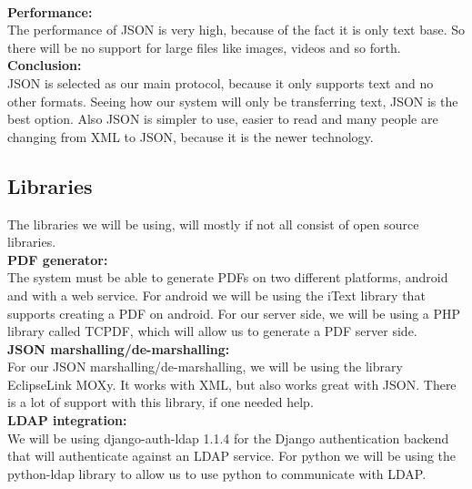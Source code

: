 \documentclass[12pt]{article}
\begin{document}
		\\\linebreak
		\textbf{Performance:}
		\\\linebreak
		The performance of JSON is very high, because of the fact it is only text base. So there will be no 		support for large files like images, videos and so forth.
		\\\linebreak\linebreak
		\textbf{Conclusion:}
		\\\linebreak
		JSON is selected as our main protocol, because it only supports text and no other formats. Seeing how 		our system will only be transferring text, JSON is the best option. Also JSON is simpler to use, 			easier to read and many people are changing from XML to JSON, because it is the newer technology.
				
		\vspace{0.5cm}
				
		\subsection{Libraries}
		\vspace{0.5cm}
		
		The libraries we will be using, will mostly if not all consist of open source libraries.
		\\\linebreak
		\textbf{PDF generator:}
		\\\linebreak
		The system must be able to generate PDFs on two different platforms, android and with a web service. 		For android we will be using the iText library that supports creating a PDF on android. For our server 	side, we will be using a PHP library called TCPDF, which will allow us to generate a PDF server side.
		\\\linebreak
		\textbf{JSON marshalling/de-marshalling:}
		\\\linebreak
		For our JSON marshalling/de-marshalling, we will be using the library EclipseLink MOXy. It works with 		XML, but also works great with JSON. There is a lot of support with this library, if one needed help.
		\\\linebreak
		\textbf{LDAP integration:}
		\\\linebreak
		We will be using django-auth-ldap 1.1.4 for the Django authentication backend that will authenticate 		against an LDAP service. For python we will be using the python-ldap library to allow us to use python 	to communicate with LDAP.
\end{document}
